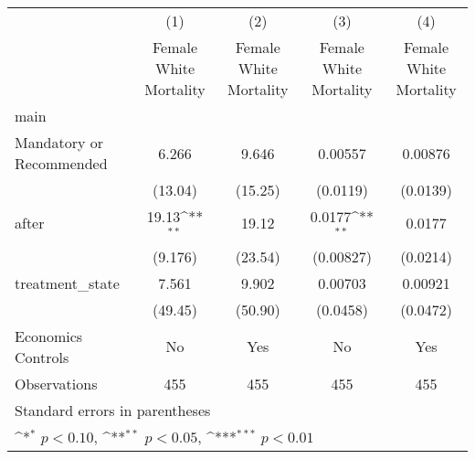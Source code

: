 {
\def\sym#1{\ifmmode^{#1}\else\(^{#1}\)\fi}
\begin{longtable}{l*{4}{c}}
\hline\hline\endfirsthead\hline\endhead\hline\endfoot\endlastfoot
                    &\multicolumn{1}{c}{(1)}&\multicolumn{1}{c}{(2)}&\multicolumn{1}{c}{(3)}&\multicolumn{1}{c}{(4)}\\
                    &\multicolumn{1}{c}{Female White Mortality}&\multicolumn{1}{c}{Female White Mortality}&\multicolumn{1}{c}{Female White Mortality}&\multicolumn{1}{c}{Female White Mortality}\\
\hline
main                &                     &                     &                     &                     \\
Mandatory or Recommended&       6.266         &       9.646         &     0.00557         &     0.00876         \\
                    &     (13.04)         &     (15.25)         &    (0.0119)         &    (0.0139)         \\
[1em]
after               &       19.13\sym{**} &       19.12         &      0.0177\sym{**} &      0.0177         \\
                    &     (9.176)         &     (23.54)         &   (0.00827)         &    (0.0214)         \\
[1em]
treatment\_state     &       7.561         &       9.902         &     0.00703         &     0.00921         \\
                    &     (49.45)         &     (50.90)         &    (0.0458)         &    (0.0472)         \\
[1em]
Economics Controls  &          No         &         Yes         &          No         &         Yes         \\
\hline
Observations        &         455         &         455         &         455         &         455         \\
\hline\hline
\multicolumn{5}{l}{\footnotesize Standard errors in parentheses}\\
\multicolumn{5}{l}{\footnotesize \sym{*} \(p<0.10\), \sym{**} \(p<0.05\), \sym{***} \(p<0.01\)}\\
\end{longtable}
}
